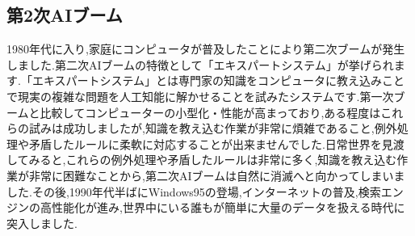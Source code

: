 \subsection{第2次AIブーム}
1980年代に入り,家庭にコンピュータが普及したことにより第二次ブームが発生しました.第二次AIブームの特徴として「エキスパートシステム」が挙げられます.「エキスパートシステム」とは専門家の知識をコンピュータに教え込みことで現実の複雑な問題を人工知能に解かせることを試みたシステムです.第一次ブームと比較してコンピューターの小型化・性能が高まっており,ある程度はこれらの試みは成功しましたが,知識を教え込む作業が非常に煩雑であること,例外処理や矛盾したルールに柔軟に対応することが出来ませんでした.日常世界を見渡してみると,これらの例外処理や矛盾したルールは非常に多く,知識を教え込む作業が非常に困難なことから,第二次AIブームは自然に消滅へと向かってしまいました.その後,1990年代半ばにWindows95の登場,インターネットの普及,検索エンジンの高性能化が進み,世界中にいる誰もが簡単に大量のデータを扱える時代に突入しました.\\

